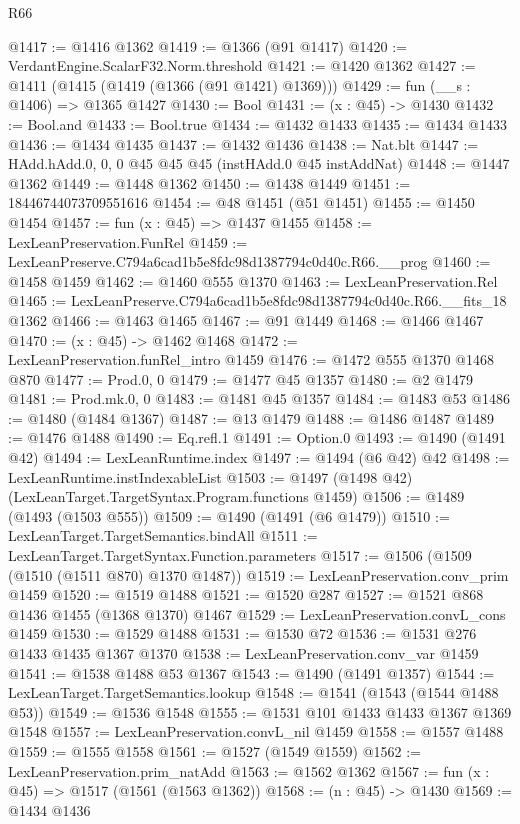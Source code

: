 \begin{lexlean}{R66}
\begin{coremodule}
@1417 := @1416 @1362
@1419 := @1366 (@91 @1417)
@1420 := VerdantEngine.ScalarF32.Norm.threshold
@1421 := @1420 @1362
@1427 := @1411 (@1415 (@1419 (@1366 (@91 @1421) @1369)))
@1429 := fun (__s : @1406) => @1365 @1427
@1430 := Bool
@1431 := (x : @45) -> @1430
@1432 := Bool.and
@1433 := Bool.true
@1434 := @1432 @1433
@1435 := @1434 @1433
@1436 := @1434 @1435
@1437 := @1432 @1436
@1438 := Nat.blt
@1447 := HAdd.hAdd.{0, 0, 0} @45 @45 @45 (instHAdd.{0} @45 instAddNat)
@1448 := @1447 @1362
@1449 := @1448 @1362
@1450 := @1438 @1449
@1451 := 18446744073709551616
@1454 := @48 @1451 (@51 @1451)
@1455 := @1450 @1454
@1457 := fun (x : @45) => @1437 @1455
@1458 := LexLeanPreservation.FunRel
@1459 := LexLeanPreserve.C794a6cad1b5e8fdc98d1387794c0d40c.R66.__prog
@1460 := @1458 @1459
@1462 := @1460 @555 @1370
@1463 := LexLeanPreservation.Rel
@1465 := LexLeanPreserve.C794a6cad1b5e8fdc98d1387794c0d40c.R66.__fits_18 @1362
@1466 := @1463 @1465
@1467 := @91 @1449
@1468 := @1466 @1467
@1470 := (x : @45) -> @1462 @1468
@1472 := LexLeanPreservation.funRel_intro @1459
@1476 := @1472 @555 @1370 @1468 @870
@1477 := Prod.{0, 0}
@1479 := @1477 @45 @1357
@1480 := @2 @1479
@1481 := Prod.mk.{0, 0}
@1483 := @1481 @45 @1357
@1484 := @1483 @53
@1486 := @1480 (@1484 @1367)
@1487 := @13 @1479
@1488 := @1486 @1487
@1489 := @1476 @1488
@1490 := Eq.refl.{1}
@1491 := Option.{0}
@1493 := @1490 (@1491 @42)
@1494 := LexLeanRuntime.index
@1497 := @1494 (@6 @42) @42
@1498 := LexLeanRuntime.instIndexableList
@1503 := @1497 (@1498 @42) (LexLeanTarget.TargetSyntax.Program.functions @1459)
@1506 := @1489 (@1493 (@1503 @555))
@1509 := @1490 (@1491 (@6 @1479))
@1510 := LexLeanTarget.TargetSemantics.bindAll
@1511 := LexLeanTarget.TargetSyntax.Function.parameters
@1517 := @1506 (@1509 (@1510 (@1511 @870) @1370 @1487))
@1519 := LexLeanPreservation.conv_prim @1459
@1520 := @1519 @1488
@1521 := @1520 @287
@1527 := @1521 @868 @1436 @1455 (@1368 @1370) @1467
@1529 := LexLeanPreservation.convL_cons @1459
@1530 := @1529 @1488
@1531 := @1530 @72
@1536 := @1531 @276 @1433 @1435 @1367 @1370
@1538 := LexLeanPreservation.conv_var @1459
@1541 := @1538 @1488 @53 @1367
@1543 := @1490 (@1491 @1357)
@1544 := LexLeanTarget.TargetSemantics.lookup
@1548 := @1541 (@1543 (@1544 @1488 @53))
@1549 := @1536 @1548
@1555 := @1531 @101 @1433 @1433 @1367 @1369 @1548
@1557 := LexLeanPreservation.convL_nil @1459
@1558 := @1557 @1488
@1559 := @1555 @1558
@1561 := @1527 (@1549 @1559)
@1562 := LexLeanPreservation.prim_natAdd
@1563 := @1562 @1362
@1567 := fun (x : @45) => @1517 (@1561 (@1563 @1362))
@1568 := (n : @45) -> @1430
@1569 := @1434 @1436

\end{coremodule}
\end{lexlean}
